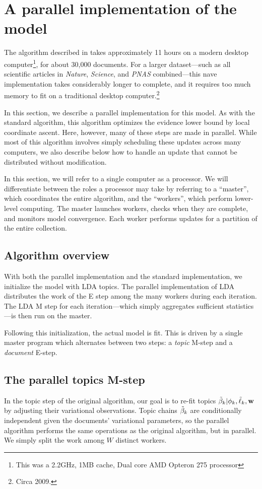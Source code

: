 \section{A parallel implementation of the model}
\label{section:influence_parallel_inference}

The algorithm described in  takes approximately 11
hours on a modern desktop computer\footnote{This was a 2.2GHz, 1MB
  cache, Dual core AMD Opteron 275 processor}, for about 30,000
documents.  For a larger dataset---such as all scientific articles in
\emph{Nature}, \emph{Science}, and \emph{PNAS} combined---this
nave implementation takes considerably longer to complete, and it
requires too much memory to fit on a traditional desktop
computer.\footnote{Circa 2009.}

In this section, we describe a parallel implementation for this model.
As with the standard algorithm, this algorithm optimizes the evidence
lower bound by local coordinate ascent.  Here, however, many of these
steps are made in parallel.  While most of this algorithm involves
simply scheduling these updates across many computers, we also
describe below how to handle an update that cannot be distributed
without modification.

In this section, we will refer to a single computer as a processor.
We will differentiate between the roles a processor may take by
referring to a ``master'', which coordinates the entire algorithm, and
the ``workers'', which perform lower-level computing.  The master
launches workers, checks when they are complete, and monitors model
convergence.  Each worker performs updates for a partition of the
entire collection.

\subsection*{Algorithm overview}
With both the parallel implementation and the standard implementation,
we initialize the model with LDA topics.  The parallel implementation
of LDA distributes the work of the E step among the many workers
during each iteration.  The LDA M step for each iteration---which
simply aggregates sufficient statistics---is then run on the master.

Following this initialization, the actual model is fit.  This is
driven by a single master program which alternates between two steps:
a \emph{topic} M-step and a \emph{document} E-step.

\subsection*{The parallel topics M-step}
In the topic step of the original algorithm, our goal is to re-fit
topics $\tilde{\beta}_k | \phi_k, \tilde{\ell}_k, \textbf{w}$ by adjusting their variational
observations.  Topic chains $\tilde{\beta}_k$ are conditionally independent
given the documents' variational parameters, so the parallel algorithm
performs the same operations as the original algorithm, but in
parallel.  We simply split the work among $W$ distinct workers.

